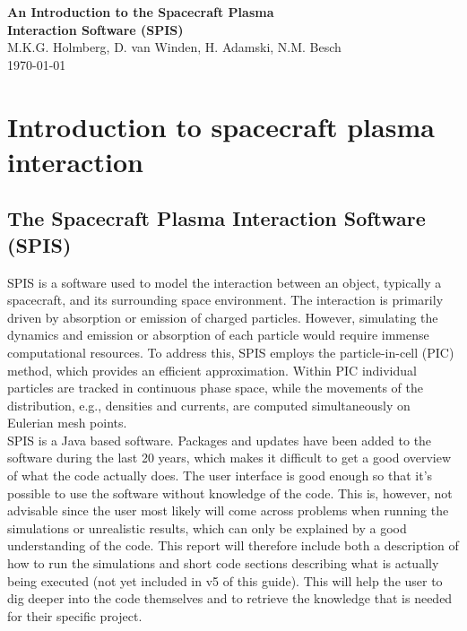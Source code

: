 \documentclass[a4paper, 12pt]{article}
\begin{document}
 \begin{titlepage}
    \begin{center}
      {\Large\bfseries An Introduction to the Spacecraft Plasma\\[1ex] Interaction Software (SPIS)}\\[2cm]
      {\large M.K.G. Holmberg, D. van Winden, H. Adamski, N.M. Besch}\\[2cm]
      \today
    \end{center}
    \vspace*{\fill}
  \end{titlepage}
\voffset=20pt
\setlength{\textheight=660pt}
\setlength{\parindent=0pt}
\newpage
\doublespacing
\tableofcontents
\singlespacing
\newpage

\section{Introduction to spacecraft plasma interaction}

\subsection{The Spacecraft Plasma Interaction Software (SPIS)}
\vspace{2mm}

SPIS is a software used to model the interaction between an object, typically a spacecraft, and its surrounding space environment. The interaction is primarily driven by absorption or emission of charged particles. However, simulating the dynamics and emission or absorption of each particle would require immense computational resources. To address this, SPIS employs the particle-in-cell (PIC) method, which provides an efficient approximation. Within PIC individual particles are tracked in continuous phase space, while the movements of the distribution, e.g., densities and currents, are computed simultaneously on Eulerian mesh points.\\

SPIS is a Java based software. Packages and updates have been added to the software during the last 20 years, which makes it difficult to get a good overview of what the code actually does. The user interface is good enough so that it's possible to use the software without knowledge of the code. This is, however, not advisable since the user most likely will come across problems when running the simulations or unrealistic results, which can only be explained by a good understanding of the code. This report will therefore include both a description of how to run the simulations and short code sections describing what is actually being executed (not yet included in v5 of this guide). This will help the user to dig deeper into the code themselves and to retrieve the knowledge that is needed for their specific project.
\end{document}
